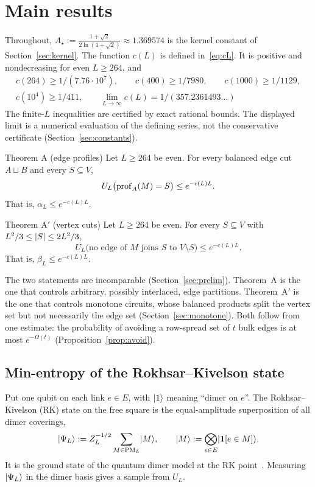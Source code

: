 \section{Main results}\label{sec:results}

Throughout, $A_\star:=\frac{1+\sqrt2}{2\ln(1+\sqrt2)}\approx1.369574$ is the kernel constant of Section~\ref{sec:kernel}. The function $c(L)$ is defined in~\eqref{eq:cL}. It is positive and nondecreasing for even $L\ge264$, and
\begin{gather*}
  c(264)\ge 1/(7.76\cdot10^{7}),\qquad c(400)\ge1/7980,\qquad c(1000)\ge1/1129,\\
  c(10^4)\ge1/411,\qquad \lim_{L\to\infty}c(L)=1/(357.2361493\ldots)
\end{gather*}
The finite-$L$ inequalities are certified by exact rational bounds. The displayed limit is a numerical evaluation of the defining series, not the conservative certificate (Section~\ref{sec:constants}).

\begin{named}{Theorem A (edge profiles)}
Let $L\ge264$ be even. For every balanced edge cut $A\sqcup B$ and every $S\subseteq V$,
\[
  U_L\bigl(\operatorname{prof}_A(M)=S\bigr)\le e^{-c(L)L}.
\]
That is, $\alpha_L\le e^{-c(L)L}$.
\end{named}

\begin{named}{Theorem A$'$ (vertex cuts)}
Let $L\ge264$ be even. For every $S\subseteq V$ with $L^2/3\le\lvert S\rvert\le 2L^2/3$,
\[
  U_L\bigl(\text{no edge of $M$ joins $S$ to $V\setminus S$}\bigr)\le e^{-c(L)L}.
\]
That is, $\beta_L\le e^{-c(L)L}$.
\end{named}

The two statements are incomparable (Section~\ref{sec:prelim}). Theorem~A is the one that controls arbitrary, possibly interlaced, edge partitions. Theorem~A$'$ is the one that controls monotone circuits, whose balanced products split the vertex set but not necessarily the edge set (Section~\ref{sec:monotone}). Both follow from one estimate: the probability of avoiding a row-spread set of $t$ bulk edges is at most $e^{-\Omega(t)}$ (Proposition~\ref{prop:avoid}).

\subsection{Min-entropy of the Rokhsar--Kivelson state}

Put one qubit on each link $e\in E$, with $\lvert 1\rangle$ meaning ``dimer on $e$''. The Rokhsar--Kivelson (RK) state on the free square is the equal-amplitude superposition of all dimer coverings,
\[
  \lvert \Psi_L\rangle:=Z_L^{-1/2}\sum_{M\in\mathrm{PM}_L}\lvert M\rangle,\qquad \lvert M\rangle:=\bigotimes_{e\in E}\lvert \mathbf{1}[e\in M]\rangle .
\]
It is the ground state of the quantum dimer model at the RK point~\cite{RokhsarKivelson88}. Measuring $\lvert \Psi_L\rangle$ in the dimer basis gives a sample from $U_L$.

